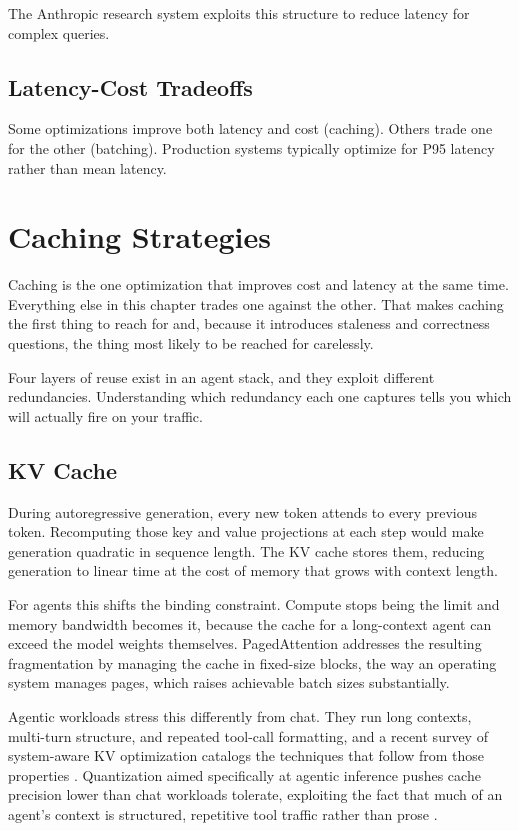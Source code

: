 The Anthropic research system \cite{anthropicresearch2025} exploits this structure to reduce latency for complex queries.

\subsection{Latency-Cost Tradeoffs}

Some optimizations improve both latency and cost (caching). Others trade one for the other (batching). Production systems typically optimize for P95 latency rather than mean latency.

\section{Caching Strategies}

Caching is the one optimization that improves cost and latency at the same time.
Everything else in this chapter trades one against the other. That makes caching
the first thing to reach for and, because it introduces staleness and correctness
questions, the thing most likely to be reached for carelessly.

Four layers of reuse exist in an agent stack, and they exploit different
redundancies. Understanding which redundancy each one captures tells you which
will actually fire on your traffic.

\subsection{KV Cache}

During autoregressive generation, every new token attends to every previous
token. Recomputing those key and value projections at each step would make
generation quadratic in sequence length. The KV cache stores them, reducing
generation to linear time at the cost of memory that grows with context length.

For agents this shifts the binding constraint. Compute stops being the limit and
memory bandwidth becomes it, because the cache for a long-context agent can
exceed the model weights themselves. PagedAttention \cite{vllm2023} addresses the
resulting fragmentation by managing the cache in fixed-size blocks, the way an
operating system manages pages, which raises achievable batch sizes substantially.

Agentic workloads stress this differently from chat. They run long contexts,
multi-turn structure, and repeated tool-call formatting, and a recent survey of
system-aware KV optimization catalogs the techniques that follow from those
properties \cite{kvsurvey2026}. Quantization aimed specifically at agentic
inference pushes cache precision lower than chat workloads tolerate, exploiting
the fact that much of an agent's context is structured, repetitive tool traffic
rather than prose \cite{triaxialkv2026}.

